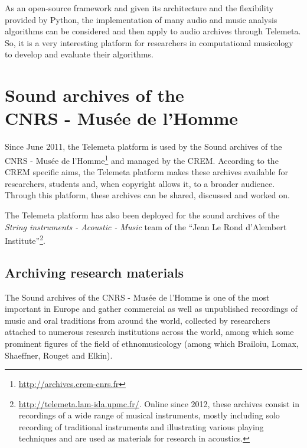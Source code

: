 \documentclass{sig-alternate}
\begin{document}
As an open-source framework and given its architecture and the flexibility provided by Python, the implementation of many audio and music analysis algorithms can be considered and then apply to audio archives through Telemeta. So, it is a very interesting platform for researchers in computational musicology to develop and evaluate their algorithms.


\section{Sound archives of the \\CNRS - Musée de l'Homme}\label{sec:archives-CREM}
Since June 2011, the Telemeta platform is used by the  Sound archives of the CNRS - Musée de l'Homme\footnote{\url{http://archives.crem-cnrs.fr}} and managed by the CREM. According to the CREM specific aims, the Telemeta platform makes these archives available for researchers, students and, when copyright allows it, to a broader audience. Through this platform, these archives can be shared, discussed and worked on.

The Telemeta platform has also been deployed for the sound archives of the \emph{String instruments - Acoustic - Music} team of the ``Jean Le Rond d'Alembert Institute''\footnote{\url{http://telemeta.lam-ida.upmc.fr/}. Online since 2012, these archives consist in recordings of a wide range of musical instruments, mostly including solo recording of traditional instruments and illustrating various playing techniques and are used as materials for research in acoustics.}.



\subsection{Archiving research materials}
The Sound archives of the CNRS - Musée de l'Homme is one of the most important in Europe and gather commercial as well as unpublished recordings of music and oral traditions from around the world, collected by researchers attached to numerous research institutions across the world, among which some prominent figures of the field of ethnomusicology (among which Brailoiu, Lomax, Shaeffner, Rouget and Elkin). 
\end{document}
